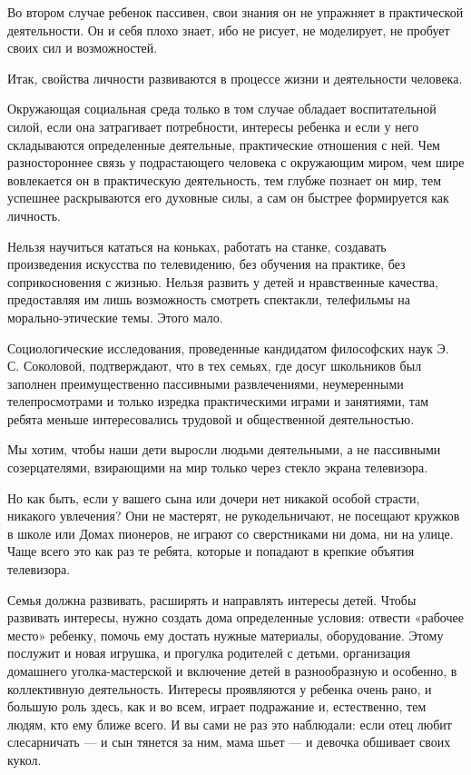 \documentclass[12pt, a4paper, openany]{book}
\begin{document}
Во втором случае ребенок пассивен, свои знания он не упражняет в практической деятельности. Он и себя плохо знает, ибо не рисует, не моделирует, не пробует своих сил и возможностей. 

Итак, свойства личности развиваются в процессе жизни и деятельности человека. 

Окружающая социальная среда только в том случае обладает воспитательной силой, если она затрагивает потребности, интересы ребенка и если у него складываются определенные деятельные, практические отношения с ней. Чем разностороннее связь у подрастающего человека с окружающим миром, чем шире вовлекается он в практическую деятельность, тем глубже познает он мир, тем успешнее раскрываются его духовные силы, а сам он быстрее формируется как личность.

Нельзя научиться кататься на коньках, работать на станке, создавать произведения искусства по телевидению, без обучения на практике, без соприкосновения с жизнью. Нельзя развить у детей и нравственные качества, предоставляя им лишь возможность смотреть спектакли, телефильмы на морально-этические темы. Этого мало. 

Социологические исследования, проведенные кандидатом философских наук Э. С. Соколовой, подтверждают, что в тех семьях, где досуг школьников был заполнен преимущественно пассивными развлечениями, неумеренными телепросмотрами и только изредка практическими играми и занятиями, там ребята меньше интересовались трудовой и общественной деятельностью. 

Мы хотим, чтобы наши дети выросли людьми деятельными, а не пассивными созерцателями, взирающими на мир только через стекло экрана телевизора. 

Но как быть, если у вашего сына или дочери нет никакой особой страсти, никакого увлечения? Они не мастерят, не рукодельничают, не посещают кружков в школе или Домах пионеров, не играют со сверстниками ни дома, ни на улице. Чаще всего это как раз те ребята, которые и попадают в крепкие объятия телевизора. 

Семья должна развивать, расширять и направлять интересы детей. Чтобы развивать интересы, нужно создать дома определенные условия: отвести «рабочее место» ребенку, помочь ему достать нужные материалы, оборудование. Этому послужит и новая игрушка, и прогулка родителей с детьми, организация домашнего уголка-мастерской и включение детей в разнообразную и особенно, в коллективную деятельность. Интересы проявляются у ребенка очень рано, и большую роль здесь, как и во всем, играет подражание и, естественно, тем людям, кто ему ближе всего. И вы сами не раз это наблюдали: если отец любит слесарничать — и сын тянется за ним, мама шьет — и девочка обшивает своих кукол. 
\end{document}
